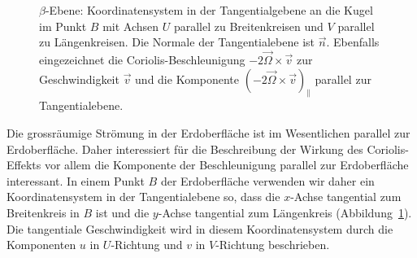 \begin{figure}
\centering
{}
\caption{$\beta$-Ebene: Koordinatensystem in der Tangentialgebene an die Kugel
im Punkt $B$ mit Achsen $U$ parallel zu Breitenkreisen und $V$ parallel
zu Längenkreisen.
Die Normale der Tangentialebene ist $\vec{n}$.
Ebenfalls eingezeichnet die Coriolis-Beschleunigung
$-2\vec{\Omega}\times\vec{v}$ zur Geschwindigkeit $\vec{v}$ und
die Komponente $(-2\vec{\Omega}\times\vec{v})_{\|}$ parallel
zur Tangentialebene.
\label{skript:betaplane}}
\end{figure}
Die grossräumige Strömung in der Erdoberfläche ist im Wesentlichen 
parallel zur Erdoberfläche.
Daher interessiert für die Beschreibung der Wirkung des Coriolis-Effekts
vor allem die Komponente der Beschleunigung parallel zur Erdoberfläche 
interessant.
In einem Punkt $B$ der Erdoberfläche verwenden wir daher ein
Koordinatensystem in der Tangentialebene so, dass die $x$-Achse tangential
zum Breitenkreis in $B$ ist und die $y$-Achse tangential zum Längenkreis
(Abbildung~\ref{skript:betaplane}).
Die tangentiale Geschwindigkeit wird in diesem Koordinatensystem durch die
Komponenten $u$ in $U$-Richtung und $v$ in $V$-Richtung beschrieben.

